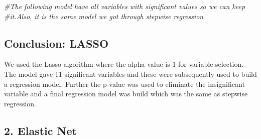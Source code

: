\documentclass[
]{article}
\newenvironment{Shaded}{\begin{snugshade}}{\end{snugshade}}
\newcommand{\CommentTok}[1]{\textcolor[rgb]{0.56,0.35,0.01}{\textit{#1}}}
\begin{document}
\begin{Shaded}
\begin{Highlighting}[]
\CommentTok{#The following model have all variables with significant values so we can keep }
\CommentTok{#it.Also, it is the same model we got through stepwise regression}
\end{Highlighting}
\end{Shaded}

\hypertarget{conclusion-lasso}{%
\subsection{Conclusion: LASSO}\label{conclusion-lasso}}

We used the Lasso algorithm where the alpha value is 1 for variable
selection. The model gave 11 significant variables and these were
subsequently used to build a regression model. Further the p-value was
used to eliminate the insignificant variable and a final regression
model was build which was the same as stepwise regression.

\hypertarget{elastic-net}{%
\subsection{2. Elastic Net}\label{elastic-net}}
\end{document}
